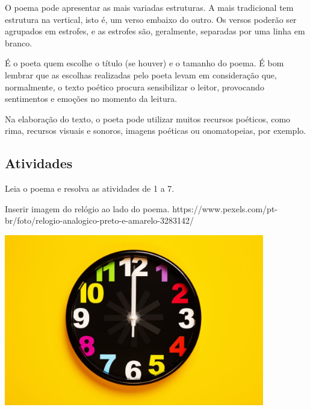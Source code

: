O poema pode apresentar as mais variadas estruturas. A mais tradicional tem
estrutura na vertical, isto é, um verso embaixo do outro. Os versos
poderão ser agrupados em estrofes, e as estrofes são, geralmente,
separadas por uma linha em branco.

É o poeta quem escolhe o título (se houver) e o tamanho do poema. É bom lembrar que
as escolhas realizadas pelo
poeta levam em consideração que, normalmente, o texto poético procura
sensibilizar o leitor, provocando sentimentos e emoções no momento da
leitura.

Na elaboração do texto, o poeta pode utilizar muitos recursos poéticos,
como rima, recursos visuais e sonoros, imagens poéticas ou
onomatopeias, por exemplo.

\subsection{Atividades}\label{atividades-4}

Leia o poema e resolva as atividades de 1 a 7.

Inserir imagem do relógio ao lado do poema.
https://www.pexels.com/pt-br/foto/relogio-analogico-preto-e-amarelo-3283142/

\includegraphics[width=4.46875in,height=2.93485in]{media/image16.jpeg}

